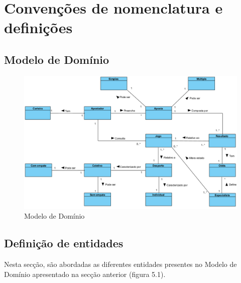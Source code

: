 \chapter{Convenções de nomenclatura e definições}

\section{Modelo de Domínio}

\begin{figure}[!htb]
\centering
\includegraphics[width=1\linewidth]{imagens/convencao/domainModel.png}
\caption{Modelo de Domínio }
\label{}
\end{figure}%

\section{Definição de entidades}

Nesta secção, são abordadas as diferentes entidades presentes no Modelo de Domínio apresentado na secção anterior (figura 5.1). 

